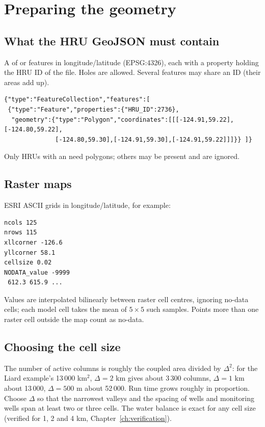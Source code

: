 \section{Preparing the geometry}
\subsection{What the HRU GeoJSON must contain}
A  of  or  features in longitude/latitude (EPSG:4326), each with a
property holding the HRU ID of the  file. Holes are allowed. Several features may share an ID (their areas add up).
\par\noindent\begin{minipage}{\linewidth}
\begin{lstlisting}
{"type":"FeatureCollection","features":[
 {"type":"Feature","properties":{"HRU_ID":2736},
  "geometry":{"type":"Polygon","coordinates":[[[-124.91,59.22],[-124.80,59.22],
              [-124.80,59.30],[-124.91,59.30],[-124.91,59.22]]]}} ]}
\end{lstlisting}
\end{minipage}\par\smallskip
Only HRUs with an  need polygons; others may be present and are ignored.
\subsection{Raster maps}
ESRI ASCII grids in longitude/latitude, for example:
\par\noindent\begin{minipage}{\linewidth}
\begin{lstlisting}
ncols 125
nrows 115
xllcorner -126.6
yllcorner 58.1
cellsize 0.02
NODATA_value -9999
 612.3 615.9 ...
\end{lstlisting}
\end{minipage}\par\smallskip
Values are interpolated bilinearly between raster cell centres, ignoring no-data cells; each model cell takes the mean of
$5\times5$ such samples. Points more than one raster cell outside the map count as no-data.
\subsection{Choosing the cell size}
The number of active columns is roughly the coupled area divided by $\Delta^2$: for the Liard example's 13\,000 km$^2$,
$\Delta=2$ km gives about 3\,300 columns, $\Delta=1$ km about 13\,000, $\Delta=500$ m about 52\,000. Run time grows roughly in
proportion. Choose $\Delta$ so that the narrowest valleys and the spacing of wells and monitoring wells span at least two or
three cells. The water balance is exact for any cell size (verified for 1, 2 and 4 km, Chapter~\ref{ch:verification}).


